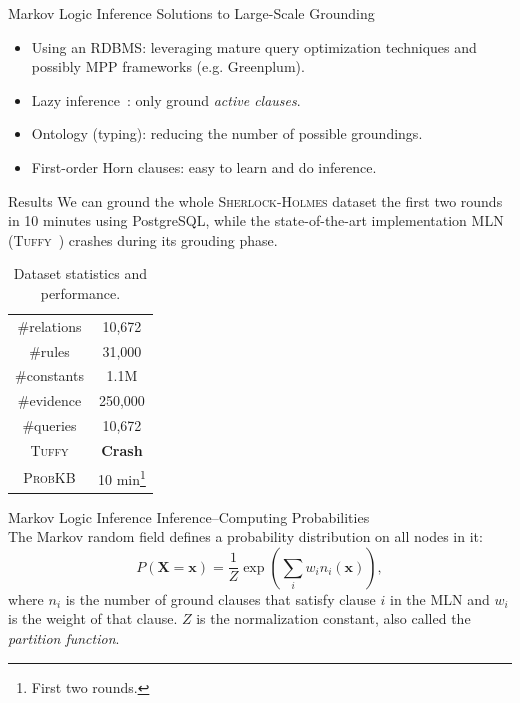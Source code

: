\documentclass[onlymath,xcolor=pdftex,dvipsnames,table]{beamer}
\newcommand{\probkb}{\textsc{ProbKB}\xspace}
\newcommand{\sherlock}{\textsc{Sherlock}\xspace}
\newcommand{\holmes}{\textsc{Holmes}\xspace}
\newcommand{\tuffy}{\textsc{Tuffy}\xspace}
\let\oldemph\emph
\renewcommand{\emph}[1]{{\color{Blue}\oldemph{#1}}}
\newcommand{\head}[1]{{\large\color{OliveGreen}#1\\[5pt]}}
\begin{document}
\begin{frame}{Markov Logic Inference}
\head{Solutions to Large-Scale Grounding}
\begin{itemize}
  \item Using an RDBMS: leveraging mature query optimization techniques and possibly MPP frameworks (e.g. Greenplum).
  \item Lazy inference~\cite{singla2006memory}: only ground \emph{active clauses}.
  \item Ontology (typing): reducing the number of possible groundings.
  \item First-order Horn clauses: easy to learn and do inference.
\end{itemize}
\end{frame}


\begin{frame}{Results}
We can ground the whole \sherlock-\holmes dataset the first two rounds in 10 minutes using PostgreSQL, while the state-of-the-art implementation MLN (\tuffy~\cite{DBLP:journals/pvldb/NiuRDS11}) crashes during its grouding phase.
\begin{table}
  \centering
  \begin{tabular}{|c|c|}\hline
   \#relations & 10,672 \\
   \#rules     & 31,000 \\
   \#constants & 1.1M \\
   \#evidence  & 250,000 \\
   \#queries   & 10,672 \\
   \tuffy      & \textbf{\color{Red}Crash} \\
   \probkb     & 10 min\footnote{First two rounds.} \\
   \hline
  \end{tabular}
  \caption{Dataset statistics and performance.}
\end{table}
\end{frame}

\begin{frame}{Markov Logic Inference}
\head{Inference--Computing Probabilities}
The Markov random field defines a probability distribution on all nodes in it:
$$P(\mathbf{X}=\mathbf{x})=\frac{1}{Z}\exp\left(\sum_iw_in_i(\mathbf{x})\right),$$
where $n_i$ is the number of ground clauses that satisfy clause $i$ in the MLN and $w_i$ is the weight of that clause. $Z$ is the normalization constant, also called the \emph{partition function}.
\end{frame}
\end{document}
